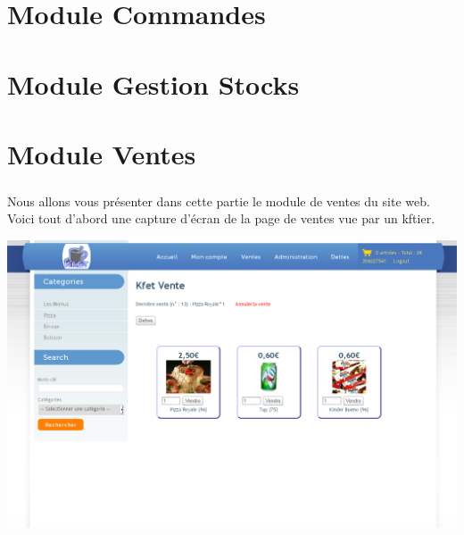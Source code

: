 \documentclass[twoside,UTF8]{EPURapport}
\begin{document}
\chapter{Module Commandes}

\chapter{Module Gestion Stocks}

\chapter{Module Ventes}

    \paragraph{}Nous allons vous présenter dans cette partie le module de ventes du site web. Voici tout d'abord une capture d'écran de la page de ventes vue par un kftier.
    \begin{center}
        \includegraphics[width=1\linewidth]{logos/ventes.png}
    \end{center}
\end{document}
